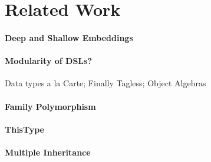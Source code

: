 \section{Related Work}

\paragraph{Deep and Shallow Embeddings}

\paragraph{Modularity of DSLs?}
Data types a la Carte; Finally Tagless; 
Object Algebras

\paragraph{Family Polymorphism}

\paragraph{ThisType}

\paragraph{Multiple Inheritance}
